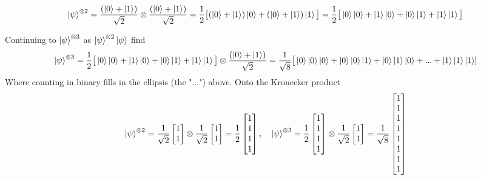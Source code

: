 \documentclass[12pt]{exam}
\begin{document}
\begin{solution}
    $$\ket{\psi}^{\otimes2} = \frac{(\ket{0}+\ket{1})}{\sqrt{2}}\otimes \frac{(\ket{0}+\ket{1})}{\sqrt{2}} = \frac{1}{2}\big[ (\ket{0}+\ket{1})\ket{0} + (\ket{0}+\ket{1})\ket{1}  \big]= \frac{1}{2}\big[ \ket{0}\ket{0}+\ket{1}\ket{0} + \ket{0}\ket{1}+\ket{1}\ket{1}  \big]$$

    Continuing to $\ket{\psi}^{\otimes 3}$ as $\ket{\psi}^{\otimes2}\ket{\psi} $ find
    $$
    \ket{\psi}^{\otimes 3} = \frac{1}{2}\big[ \ket{0}\ket{0}+\ket{1}\ket{0} + \ket{0}\ket{1}+\ket{1}\ket{1}  \big]\otimes\frac{(\ket{0}+\ket{1})}{\sqrt{2}} 
    = \frac{1}{\sqrt{8}}\big[\ket{0}\ket{0}\ket{0} + \ket{0}\ket{0}\ket{1} + \ket{0}\ket{1}\ket{0} + ... + \ket{1}\ket{1}\ket{1}]
    $$
    Where counting in binary fills in the ellipsis (the "...") above. Onto the Kronecker product 
    $$\ket{\psi}^{\otimes2} = \frac{1}{\sqrt{2}}\begin{bmatrix} 1 \\ 1 \end{bmatrix} \otimes 
     \frac{1}{\sqrt{2}}\begin{bmatrix} 1 \\ 1 \end{bmatrix} = \frac{1}{2}\begin{bmatrix}
         1 \\ 1 \\ 1 \\ 1
     \end{bmatrix}, \quad  \ket{\psi}^{\otimes 3} = \frac{1}{2}\begin{bmatrix}
         1 \\ 1 \\ 1 \\ 1
     \end{bmatrix} \otimes \frac{1}{\sqrt{2}}\begin{bmatrix} 1 \\ 1 \end{bmatrix} = \frac{1}{\sqrt{8}} \begin{bmatrix}
         1 \\ 1 \\ 1 \\ 1 \\ 1 \\ 1 \\ 1 \\ 1
     \end{bmatrix}
    $$
\end{solution}
\end{document}
